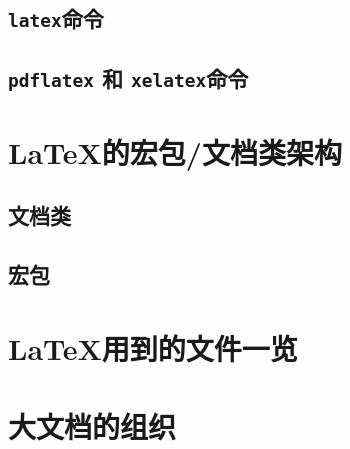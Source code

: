 \subsection{\texttt{latex}命令}

\leavevmode\nobreakspace

\subsection{\texttt{pdflatex} 和 \texttt{xelatex}命令}

\leavevmode\nobreakspace

\section{\LaTeX 的宏包/文档类架构}

\leavevmode\nobreakspace

\subsection{文档类}

\leavevmode\nobreakspace

\subsection{宏包}

\leavevmode\nobreakspace

\section{\LaTeX 用到的文件一览}

\leavevmode\nobreakspace

\section{大文档的组织}

\leavevmode\nobreakspace

\endinput